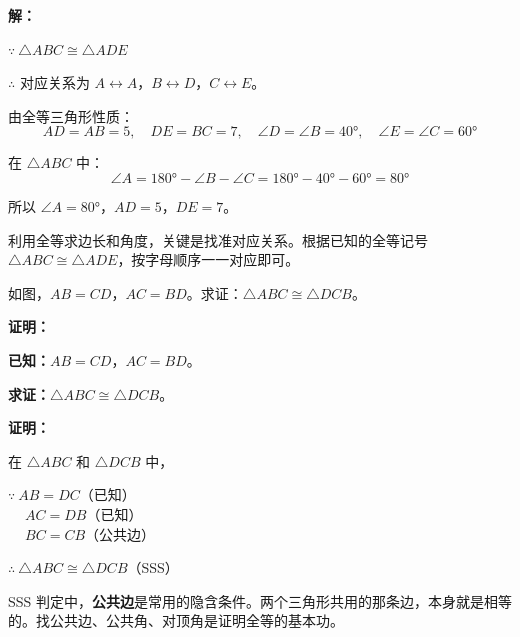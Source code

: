 \documentclass[12pt, a4paper]{ctexart}
\begin{document}
\textbf{解：}

$\because\ \triangle ABC \cong \triangle ADE$

$\therefore$ 对应关系为 $A \leftrightarrow A$，$B \leftrightarrow D$，$C \leftrightarrow E$。

由全等三角形性质：
\[
AD = AB = 5, \quad DE = BC = 7, \quad \angle D = \angle B = 40°, \quad \angle E = \angle C = 60°
\]

在 $\triangle ABC$ 中：
\[
\angle A = 180° - \angle B - \angle C = 180° - 40° - 60° = 80°
\]

所以 $\angle A = 80°$，$AD = 5$，$DE = 7$。

\begin{tipbox}[方法总结]
利用全等求边长和角度，关键是找准对应关系。根据已知的全等记号 $\triangle ABC \cong \triangle ADE$，按字母顺序一一对应即可。
\end{tipbox}

\begin{examplebox}
如图，$AB = CD$，$AC = BD$。求证：$\triangle ABC \cong \triangle DCB$。

\begin{center}
\end{center}
\end{examplebox}

\textbf{证明：}

\textbf{已知：}$AB = CD$，$AC = BD$。

\textbf{求证：}$\triangle ABC \cong \triangle DCB$。

\textbf{证明：}

在 $\triangle ABC$ 和 $\triangle DCB$ 中，

$\because\ AB = DC$（已知）\\
$\quad\ AC = DB$（已知）\\
$\quad\ BC = CB$（公共边）

$\therefore\ \triangle ABC \cong \triangle DCB$（SSS）

\begin{tipbox}[方法总结]
SSS 判定中，\textbf{公共边}是常用的隐含条件。两个三角形共用的那条边，本身就是相等的。找公共边、公共角、对顶角是证明全等的基本功。
\end{tipbox}
\end{document}
